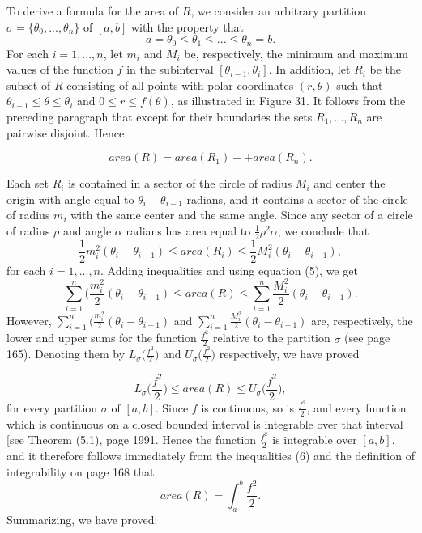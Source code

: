 
To derive a formula for the area of $R$, we consider an arbitrary partition
$\sigma = \{ \theta_0, . . . ,\theta_n \}$ of $[a, b]$ with the property that 
$$
a = \theta_0 \leq \theta_1 \leq ... \leq \theta_n = b .
$$
\noindent For each $i = 1, . . . ,n$, let $m_i$ and $M_i$ be, respectively, the minimum and maximum values of the function $f$ in the subinterval $[\theta_{i-1}, \theta_i]$. In addition,
let $R_i$ be the subset of $R$ consisting of all points with polar coordinates $(r, \theta)$ such that $\theta_{i-1} \leq \theta \leq \theta_i$ and $0 \leq r \leq f(\theta)$, as illustrated in Figure 31. It follows from the preceding paragraph that except for their boundaries the sets $R_1, . . ., R_n$ are pairwise disjoint. Hence

\begin{equation}
area(R) = area(R_1) + + area(R_n). 
\label{eq10.7.5}
\end{equation}


\noindent Each set $R_i$ is contained in a sector of the circle of radius $M_i$ and center the origin with angle equal to $\theta_i - \theta_{i-1}$ radians, and it contains a sector of the circle of radius $m_i$ with the same center and the same angle. Since any sector of a circle of radius $\rho$ and angle $\alpha$ radians has area equal to $\frac{1}{2}\rho^2 \alpha$, we conclude that 
$$
\frac{1}{2} m_i^2 (\theta_i - \theta_{i - 1}) \leq area(R_i) \leq \frac{1}{2}M_i^2 (\theta_i - \theta_{i-1}),
$$
\noindent for each $i = 1, . . ., n$. Adding inequalities and using equation (5), we get    
$$
\sum_{i=1}^n (\frac{m_i^2}{2}(\theta_i - \theta_{i-1}) \leq area(R) \leq \sum_{i=1}^n \frac{M_i^2}{2} (\theta_i - \theta_{i-1}).  
$$
\noindent However, $\sum_{i=1}^n (\frac{m_i^2}{2}(\theta_i - \theta_{i-1})$ and $\sum_{i=1}^n \frac{M_i^2}{2} (\theta_i - \theta_{i-1})$ are, respectively, the lower and upper sums for the function $\frac{f^2}{2}$ relative to the partition $\sigma$ (see page 165). Denoting them by $L_\sigma \Big(\frac{f^2}{2}\Big)$ and $U_\sigma \Big(\frac{f^2}{2}\Big)$ respectively, we have proved


\begin{equation}
L_\sigma \Big( \frac{f^2}{2} \Big) \leq area(R) \leq U_\sigma \Big( \frac{f^2}{2} \Big), 
\label{eq10.7.6}
\end{equation}
\noindent for every partition $\sigma$ of $[a, b]$. Since $f$ is continuous, so is $\frac{f^2}{2}$, and every function which is continuous on a closed bounded interval is integrable over that interval [see Theorem (5.1), page 1991. Hence the function $\frac{f^2}{2}$ is integrable over $[a, b]$, and it therefore follows immediately from the inequalities (6) and the definition of integrability on page 168 that
$$
area(R)= \int_a^b \frac{f^2}{2} .
$$
\noindent Summarizing, we have proved:


